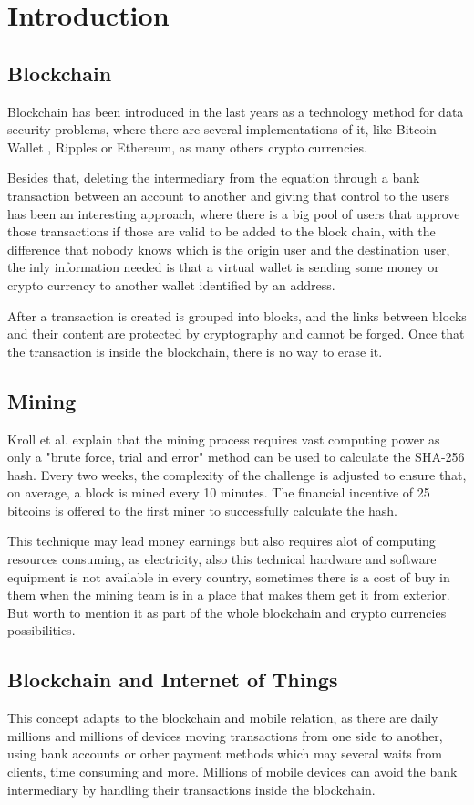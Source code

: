 \documentclass[journal]{IEEEtran}
\begin{document}
\section{Introduction}
\subsection{Blockchain}
Blockchain has been introduced in the last years as a technology method for data security problems, where there are several implementations of it, like Bitcoin Wallet \cite{Bamert2017}, Ripples or Ethereum\cite{Buterin2017}, as many others crypto currencies. 

Besides that, deleting the intermediary from the equation through a bank transaction between an account to another and giving that control to the users has been an interesting approach, where there is a big pool of users that approve those transactions if those are valid to be added to the block chain, with the difference that nobody knows which is the origin user and the destination user, the inly information needed is that a virtual wallet is sending some money or crypto currency to another wallet identified by an address.

After a transaction is created is grouped into blocks, and the links between blocks and their content are protected by cryptography and cannot be forged. Once that the transaction is inside the blockchain, there is no way to erase it.

\subsection{Mining}
Kroll et al. \cite{Kroll2013} explain that the mining process requires vast computing power as only a "brute force, trial and error" method can be used to calculate the SHA-256 hash. Every two weeks, the complexity of the challenge is adjusted to ensure that, on average, a block is mined every 10 minutes. The financial incentive of 25 bitcoins is offered to the first miner to successfully calculate the hash. 

This technique may lead money earnings but also requires alot of computing resources consuming, as electricity, also this technical hardware and software equipment is not available in every country, sometimes there is a cost of buy in them when the mining team is in a place that makes them get it from exterior. But worth to mention it as part of the whole blockchain and crypto currencies possibilities.

\subsection{Blockchain and Internet of Things}
This concept adapts to the blockchain and mobile relation, as there are daily millions and millions of devices moving transactions from one side to another, using bank accounts or orher payment methods which may several waits from clients, time consuming and more. Millions of mobile devices can avoid the bank intermediary by handling their transactions inside the blockchain.
\end{document}
